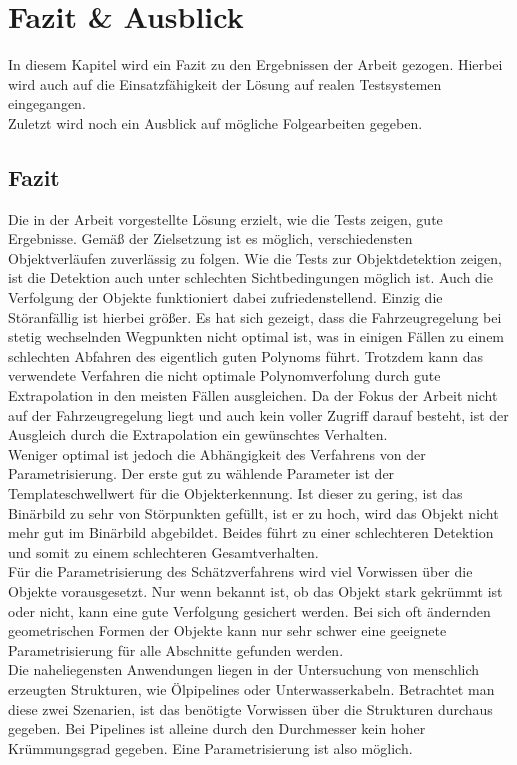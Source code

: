 \section{Fazit \& Ausblick}
In diesem Kapitel wird ein Fazit zu den Ergebnissen der Arbeit gezogen. Hierbei wird auch auf die Einsatzfähigkeit der Lösung auf realen Testsystemen eingegangen.\\
Zuletzt wird noch ein Ausblick auf mögliche Folgearbeiten gegeben.
\subsection{Fazit}
Die in der Arbeit vorgestellte Lösung erzielt, wie die Tests zeigen, gute Ergebnisse. Gemäß der Zielsetzung ist es möglich, verschiedensten Objektverläufen zuverlässig zu folgen. Wie die Tests zur Objektdetektion zeigen, ist die Detektion auch unter schlechten Sichtbedingungen möglich ist. Auch die Verfolgung der Objekte funktioniert dabei zufriedenstellend. Einzig die Störanfällig ist hierbei größer. Es hat sich gezeigt, dass die Fahrzeugregelung bei stetig wechselnden Wegpunkten nicht optimal ist, was in einigen Fällen zu einem schlechten Abfahren des eigentlich guten Polynoms führt. Trotzdem kann das verwendete Verfahren die nicht optimale Polynomverfolung durch gute Extrapolation in den meisten Fällen ausgleichen. Da der Fokus der Arbeit nicht auf der Fahrzeugregelung liegt und auch kein voller Zugriff darauf besteht, ist der Ausgleich durch die Extrapolation ein gewünschtes Verhalten.\\
Weniger optimal ist jedoch die Abhängigkeit des Verfahrens von der Parametrisierung. Der erste gut zu wählende Parameter ist der Templateschwellwert für die Objekterkennung. Ist dieser zu gering, ist das Binärbild zu sehr von Störpunkten gefüllt, ist er zu hoch, wird das Objekt nicht mehr gut im Binärbild abgebildet. Beides führt zu einer schlechteren Detektion und somit zu einem schlechteren Gesamtverhalten.\\
Für die Parametrisierung des Schätzverfahrens wird viel Vorwissen über die Objekte vorausgesetzt. Nur wenn bekannt ist, ob das Objekt stark gekrümmt ist oder nicht, kann eine gute Verfolgung gesichert werden. Bei sich oft ändernden geometrischen Formen der Objekte kann nur sehr schwer eine geeignete Parametrisierung für alle Abschnitte gefunden werden.\\
Die naheliegensten Anwendungen liegen in der Untersuchung von menschlich erzeugten Strukturen, wie Ölpipelines oder Unterwasserkabeln. Betrachtet man diese zwei Szenarien, ist das benötigte Vorwissen über die Strukturen durchaus gegeben. Bei Pipelines ist alleine durch den Durchmesser kein hoher Krümmungsgrad gegeben. Eine Parametrisierung ist also möglich.

